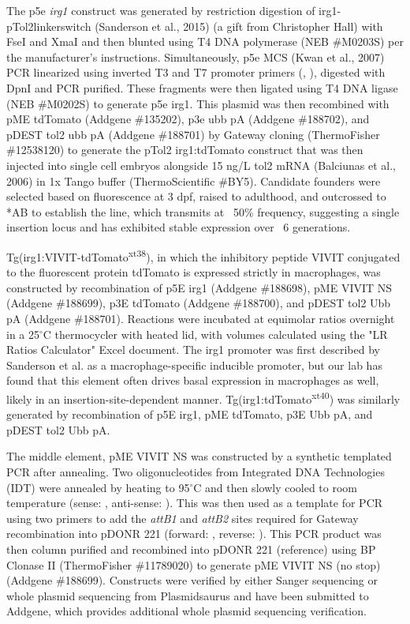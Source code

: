 The p5e \textit{irg1} construct was generated by restriction digestion of irg1-pTol2linkerswitch (Sanderson et al., 2015) (a gift from Christopher Hall) with FseI and XmaI and then blunted using T4 DNA polymerase (NEB \#M0203S) per the manufacturer's instructions. Simultaneously, p5e MCS (Kwan et al., 2007) PCR linearized using inverted T3 and T7 promoter primers (, ), digested with DpnI and PCR purified. These fragments were then ligated using T4 DNA ligase (NEB \#M0202S) to generate p5e irg1. This plasmid was then recombined with pME tdTomato (Addgene \#135202), p3e ubb pA (Addgene \#188702), and pDEST tol2 ubb pA (Addgene \#188701) by Gateway cloning (ThermoFisher \#12538120) to generate the pTol2 irg1:tdTomato construct that was then injected into single cell embryos alongside 15 ng/\textmu L tol2 mRNA (Balciunas et al., 2006) in 1x Tango buffer (ThermoScientific \#BY5). Candidate founders were selected based on fluorescence at 3 dpf, raised to adulthood, and outcrossed to *AB to establish the line, which transmits at ~50\% frequency, suggesting a single insertion locus and has exhibited stable expression over ~6 generations.

Tg(irg1:VIVIT-tdTomato\textsuperscript{xt38}), in which the inhibitory peptide VIVIT conjugated to the fluorescent protein tdTomato is expressed strictly in macrophages, was constructed by recombination of p5E irg1 (Addgene \#188698), pME VIVIT NS (Addgene \#188699), p3E tdTomato (Addgene \#188700), and pDEST tol2 Ubb pA (Addgene \#188701). Reactions were incubated at equimolar ratios overnight in a 25$^{\circ}$C thermocycler with heated lid, with volumes calculated using the "LR Ratios Calculator" Excel document. The irg1 promoter was first described by Sanderson et al. as a macrophage-specific inducible promoter, but our lab has found that this element often drives basal expression in macrophages as well, likely in an insertion-site-dependent manner. Tg(irg1:tdTomato\textsuperscript{xt40}) was similarly generated by recombination of p5E irg1, pME tdTomato, p3E Ubb pA, and pDEST tol2 Ubb pA. 

The middle element, pME VIVIT NS was constructed by a synthetic templated PCR after annealing. Two oligonucleotides from Integrated DNA Technologies (IDT) were annealed by heating to 95$^{\circ}$C and then slowly cooled to room temperature (sense: , anti-sense: ). This was then used as a template for PCR using two primers to add the \textit{attB1} and \textit{attB2} sites required for Gateway recombination into pDONR 221 (forward: , reverse: ). This PCR product was then column purified and recombined into pDONR 221 (reference) using BP Clonase II (ThermoFisher \#11789020) to generate pME VIVIT NS (no stop) (Addgene \#188699). Constructs were verified by either Sanger sequencing or whole plasmid sequencing from Plasmidsaurus and have been submitted to Addgene, which provides additional whole plasmid sequencing verification.


